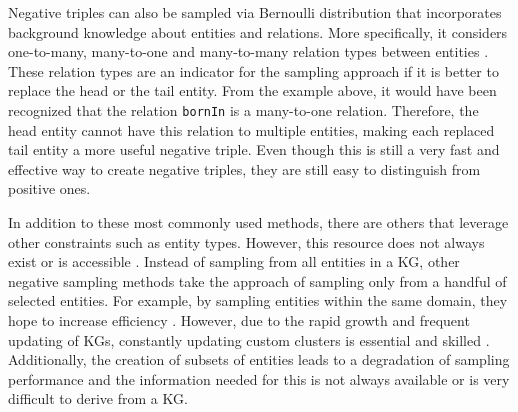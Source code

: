 Negative triples can also be sampled via Bernoulli distribution that incorporates background knowledge about entities and relations. 
More specifically, it considers one-to-many, many-to-one and many-to-many relation types between entities \cite{zhang2021efficient}.
These relation types are an indicator for the sampling approach if it is better to replace the head or the tail entity.
From the example above, it would have been recognized that the relation \texttt{bornIn} is a many-to-one relation.
Therefore, the head entity cannot have this relation to multiple entities, making each replaced tail entity a more useful negative triple.
Even though this is still a very fast and effective way to create negative triples, they are still easy to distinguish from positive ones.

In addition to these most commonly used methods, there are others that leverage other constraints such as entity types.
However, this resource does not always exist or is accessible \cite{cai2017kbgan}.
Instead of sampling from all entities in a \ac{KG}, other negative sampling methods take the approach of sampling only from a handful of selected entities.
For example, by sampling entities within the same domain, they hope to increase efficiency \cite{qiannegative}.
However, due to the rapid growth and frequent updating of \acp{KG}, constantly updating custom clusters is essential and skilled \cite{qiannegative}. 
Additionally, the creation of subsets of entities leads to a degradation of sampling performance and the information needed for this is not always available or is very difficult to derive from a \ac{KG}.



 
 
 
